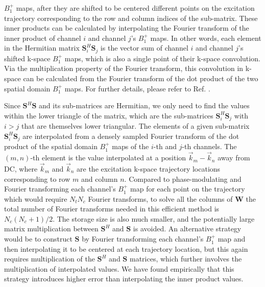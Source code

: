 $B_1^+$ maps, after they are shifted to be centered different points on the excitation trajectory corresponding to the row 
and column indices of the sub-matrix.
These inner products can be calculated by interpolating the Fourier transform of the inner product of 
channel $i$ and channel $j$'s $B_1^+$ maps. 
In other words, each element in the Hermitian matrix $\bm{S}_i^{H}\bm{S}_j$ 
is the vector sum of channel $i$ and channel $j$'s shifted k-space $B_1^+$ maps, 
which is also a single point of their k-space convolution. 
Via the multiplication property of the Fourier transform, 
this convolution in k-space can be calculated from the Fourier transform of the dot product of the two spatial domain $B_1^+$ maps. 
For further details, please refer to Ref. \cite{luo2019grappa}.

\par Since $\bm{S}^{H}\bm{S}$ and its sub-matrices are Hermitian, 
we only need to find the values within the lower triangle of the matrix, 
which are the sub-matrices $\bm{S}_i^{H}\bm{S}_j$ with $i>j$ that are themselves lower triangular. 
The elements of a given sub-matrix $\bm{S}_i^{H}\bm{S}_j$ 
are interpolated from a densely sampled Fourier transform of the dot product of the spatial domain $B_1^+$ maps of the $i$-th and $j$-th channels. 
The $(m,n)$-th element is the value interpolated at a position $\vec{k}_m-\vec{k}_n$ away from DC,
where $\vec{k}_m$ and $\vec{k}_n$ are the excitation k-space trajectory locations corresponding to row $m$ and column $n$.
Compared to phase-modulating and Fourier transforming each channel's $B_1^+$ map for each point 
on the trajectory which would require $N_t  N_c$ Fourier transforms,
to solve all the columns of $\bm{W}$ the total number of Fourier transforms needed in this efficient method is $N_c(N_c+1)/2$. 
The storage size is also much smaller, 
and the potentially large matrix multiplication between $\bm{S}^H$ and $\bm{S}$ is avoided.
An alternative strategy would be to construct $\bm{S}$ by Fourier transforming each channel's $B_1^+$ map 
and then interpolating it to be centered at each trajectory location, 
but this again requires multiplication of the $\bm{S}^{H}$ and $\bm{S}$ matrices,
which further involves the multiplication of interpolated values. 
We have found empirically that this strategy introduces higher error
than interpolating the inner product values. 


